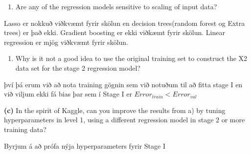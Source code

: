 \documentclass[11pt]{article}
\providecommand{\tightlist}{%
      \setlength{\itemsep}{0pt}\setlength{\parskip}{0pt}}
\begin{document}
\begin{enumerate}
\def\labelenumi{\roman{enumi})}
\setcounter{enumi}{2}
\tightlist
\item
  Are any of the regression models sensitive to scaling of input data?
\end{enumerate}

Lasso er nokkuð viðkvæmt fyrir skölun en decision trees(random forest og
Extra trees) er það ekki. Gradient boosting er ekki viðkæmt fyrir
skölun. Linear regression er mjög viðkvæmt fyrir skölun.

\begin{enumerate}
\def\labelenumi{\roman{enumi})}
\setcounter{enumi}{3}
\tightlist
\item
  Why is it not a good idea to use the original training set to
  construct the X2 data set for the stage 2 regression model?
\end{enumerate}

því þá erum við að nota training gögnin sem við notuðum til að fitta
stage I en við viljum ekki fá bias þar sem í Stage I er
\(Error_{train}<Error_{val}\)

    \textbf{(c)} In the spirit of Kaggle, can you improve the results from
a) by tuning hyperparameters in level 1, using a different regression
model in stage 2 or more training data?

    Byrjum á að prófa nýja hyperparameters fyrir Stage I
\end{document}
